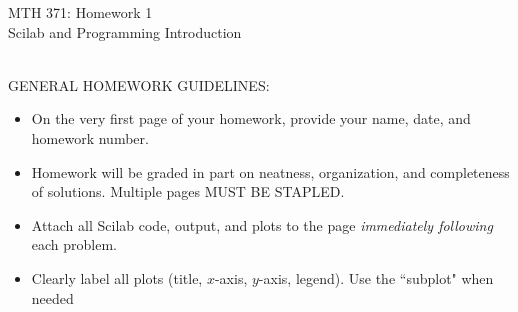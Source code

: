 \documentclass[addpoints, 11pt]{exam}
\begin{document}
\vspace{100mm}
\begin{center} \Large
MTH 371: Homework 1 \\ Scilab and Programming Introduction\normalsize
\end{center}
\ \\
\noindent GENERAL HOMEWORK GUIDELINES: 
\begin{itemize}
\item On the very first page of your homework, provide your name, date, and homework number.\vspace{-2mm}
\item Homework will be graded in part on neatness, organization, and completeness of solutions. Multiple pages MUST BE STAPLED. \vspace{-2mm}
\item Attach all Scilab code, output, and plots to the page \emph{immediately following} each problem. \vspace{-2mm}
\item Clearly label all plots (title, $x$-axis, $y$-axis, legend). Use the ``subplot" when needed
\end{itemize}
\end{document}
